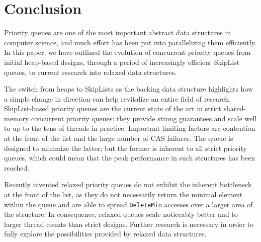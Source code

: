 \chapter{Conclusion} \label{ch:conclusion}

Priority queues are one of the most important abstract data structures in computer science,
and much effort has been put into parallelizing them efficiently. In this paper,
we have outlined the evolution of concurrent priority queues from initial heap-based designs,
through a period of increasingly efficient SkipList queues, to current research into relaxed data structures.

The switch from heaps to SkipLists as the backing data structure highlights how a simple change in
direction can help revitalize an entire field of research. SkipList-based priority queues are the current
state of the art in strict shared-memory concurrent priority queues: they provide strong guarantees
and scale well to up to the tens of threads in practice. Important limiting factors are contention
at the front of the list and the large number of \ac{CAS} failures.
The \citeauthor{linden2013skiplist} queue is designed
to minimize the latter; but the former is inherent to all strict priority queues, which could mean
that the peak performance in such structures has been reached.

Recently invented relaxed priority queues do not exhibit the inherent bottleneck at the front of the list,
as they do not necessarily return the minimal element within the queue and are able to spread
\lstinline|DeleteMin| accesses over a larger area of the structure. In consequence, relaxed queues scale noticeably
better and to larger thread counts than strict designs. Further research is necessary in order to fully
explore the possibilities provided by relaxed data structures.

